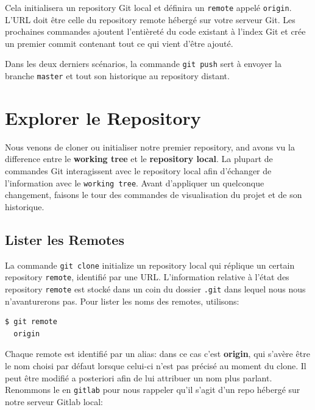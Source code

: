 \documentclass{../../common/tufte-latex/tufte-handout}
\begin{document}
Cela initialisera un repository Git local et définira un \texttt{remote} appelé \texttt{origin}. L'URL doit être celle du repository remote hébergé sur votre serveur Git. Les prochaines commandes ajoutent l'entièreté du code existant à l'index Git et crée un premier commit contenant tout ce qui vient d'être ajouté.

Dans  les deux derniers scénarios, la commande \texttt{git push} sert à envoyer la branche \texttt{master} et tout son historique au repository distant.

\section{Explorer le Repository}

Nous venons de cloner ou initialiser notre premier repository, and avons vu la difference entre le \textbf{working tree} et le \textbf{repository local}.
La plupart de commandes Git interagissent avec le repository local afin d'échanger de l'information avec le \texttt{working tree}.
Avant d'appliquer un quelconque changement, faisons le tour des commandes de visualisation du projet et de son historique.

\subsection{Lister les Remotes}

La commande \texttt{git clone} initialize un repository local qui réplique un certain repository \texttt{remote}, identifié par une URL.
L'information relative à l'état des repository \texttt{remote} est stocké dans un coin du dossier \texttt{.git} dans lequel nous nous n'avanturerons pas.
Pour lister les noms des remotes, utilisons:

\begin{lstlisting}[style=BashInputStyle]
  $ git remote
  origin
\end{lstlisting}

Chaque remote est identifié par un alias: dans ce cas c'est \textbf{origin}, qui s'avère être le nom choisi par défaut lorsque celui-ci n'est pas précisé au moment du clone.
Il peut être modifié a posteriori afin de lui attribuer un nom plus parlant.
Renommons le en \texttt{gitlab} pour nous rappeler qu'il s'agit d'un repo hébergé sur notre serveur Gitlab local:
\end{document}
